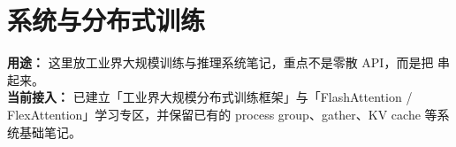 
\part*{系统与分布式训练}
{}

\begin{conceptbox}
\textbf{用途：} 这里放工业界大规模训练与推理系统笔记，重点不是零散 API，而是把 串起来。\\
\textbf{当前接入：} 已建立「工业界大规模分布式训练框架」与「FlashAttention / FlexAttention」学习专区，并保留已有的 process group、gather、KV cache 等系统基础笔记。
\end{conceptbox}






